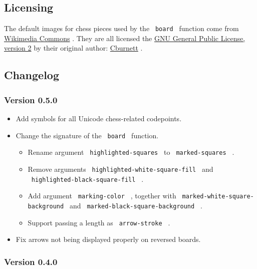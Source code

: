 \subsection{Licensing}\label{licensing}

The default images for chess pieces used by the \texttt{\ board\ }
function come from
\href{https://commons.wikimedia.org/wiki/Category:SVG_chess_pieces}{Wikimedia
Commons} . They are all licensed the
\href{https://www.gnu.org/licenses/old-licenses/gpl-2.0.html}{GNU
General Public License, version 2} by their original author:
\href{https://en.wikipedia.org/wiki/User:Cburnett}{Cburnett} .

\subsection{Changelog}\label{changelog}

\subsubsection{Version 0.5.0}\label{version-0.5.0}

\begin{itemize}
\item
  Add symbols for all Unicode chess-related codepoints.
\item
  Change the signature of the \texttt{\ board\ } function.

  \begin{itemize}
  \tightlist
  \item
    Rename argument \texttt{\ highlighted-squares\ } to
    \texttt{\ marked-squares\ } .
  \item
    Remove arguments \texttt{\ highlighted-white-square-fill\ } and
    \texttt{\ highlighted-black-square-fill\ } .
  \item
    Add argument \texttt{\ marking-color\ } , together with
    \texttt{\ marked-white-square-background\ } and
    \texttt{\ marked-black-square-background\ } .
  \item
    Support passing a length as \texttt{\ arrow-stroke\ } .
  \end{itemize}
\item
  Fix arrows not being displayed properly on reversed boards.
\end{itemize}

\subsubsection{Version 0.4.0}\label{version-0.4.0}

